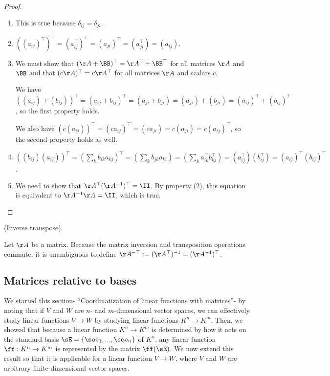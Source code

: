 \begin{proof}
    \mbox{} \\    
    \begin{enumerate}
        \item This is true because $\delta_{ij} = \delta_{ji}$.
        \item $((a_{ij})^\top)^\top = (a_{ij}^\top)^\top = (a_{ji})^\top = (a_{ji}^\top) = (a_{ij})$.
        \item We must show that $(\AA + \BB)^\top = \AA^\top + \BB^\top$ for all matrices $\AA$ and $\BB$ and that $(c\AA)^\top = c\AA^\top$ for all matrices $\AA$ and scalars $c$.

        We have $((a_{ij}) + (b_{ij}))^\top = (a_{ij} + b_{ij})^\top = (a_{ji} + b_{ji}) = (a_{ji}) + (b_{ji}) = (a_{ij})^\top + (b_{ij})^\top$, so the first property holds.

        We also have $(c(a_{ij}))^\top = (c a_{ij})^\top = (c a_{ji}) = c (a_{ji}) = c (a_{ij})^\top$, so the second property holds as well.
        
        \item $((b_{ij}) (a_{ij}))^\top = ( \sum_k b_{ik}a_{kj})^\top = (\sum_k b_{jk} a_{ki}) = (\sum_k a_{ik}^\top b_{kj}^\top) = (a_{ij}^\top) (b_{ij}^\top) = (a_{ij})^\top (b_{ij})^\top$.
        
        \item We need to show that $\AA^\top (\AA^{-1})^\top = \II$. By property (2), this equation is equivalent to $\AA^{-1} \AA = \II$, which is true.
    \end{enumerate}
\end{proof}

\begin{defn}
    (Inverse transpose).

    Let $\AA$ be a matrix. Because the matrix inversion and transposition operations commute, it is unambiguous to define $\AA^{-\top} := (\AA^{\top})^{-1} = (\AA^{-1})^\top$.
\end{defn}

\newpage

\subsection*{Matrices relative to bases}

We started this section- ``Coordinatization of linear functions with matrices''- by noting that if $V$ and $W$ are $n$- and $m$-dimensional vector spaces, we can effectively study linear functions $V \rightarrow W$ by studying linear functions $K^n \rightarrow K^m$. Then, we showed that because a linear function $K^n \rightarrow K^m$ is determined by how it acts on the standard basis $\sE = \{\see_1, ..., \see_n\}$ of $K^n$, any linear function $\ff:K^n \rightarrow K^m$ is represented by the matrix $\ff(\sE)$. We now extend this result so that it is applicable for a linear function $V \rightarrow W$, where $V$ and $W$ are arbitrary finite-dimensional vector spaces.

